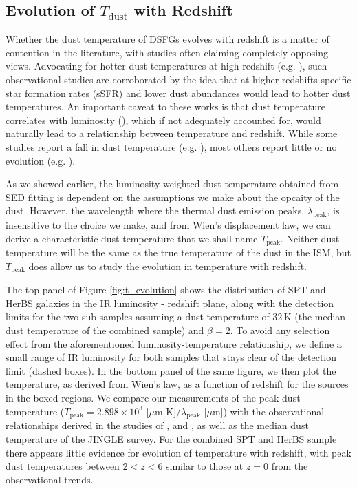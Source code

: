\subsection{Evolution of $T_{\textrm{dust}}$ with Redshift}
\label{sec:dust_temperature_evolution}

Whether the dust temperature of DSFGs evolves with redshift is a matter of contention in the literature, with studies often claiming completely opposing views. Advocating for hotter dust temperatures at high redshift (e.g. \citealt{Magdis_2012, Magnelli_2014, Swinbank_2014, Bethermin_2015, Faisst_2017, Schreiber_2018, Zavala_2018b, Liang_2019, Ma_2019, Faisst_2020, Bakx_2021, Witstok_2023}), such observational studies are corroborated by the idea that at higher redshifts specific star formation rates (sSFR) and lower dust abundances would lead to hotter dust temperatures. An important caveat to these works is that dust temperature correlates with luminosity (\citealt{Dunne_2000}), which if not adequately accounted for, would naturally lead to a relationship between temperature and redshift. While some studies report a fall in dust temperature (e.g. \citealt{Symeonidis_2013}), most others report little or no evolution (e.g. \citealt{Casey_2018, Jin_2019, Lim_2020a, Dudzeviciute_2020, Reuter_2020, Barger_2022, Drew_2022, Witstok_2023}).

As we showed earlier, the luminosity-weighted dust temperature obtained from SED fitting is dependent on the assumptions we make about the opcaity of the dust. However, the wavelength where the thermal dust emission peaks, $\lambda_\textrm{peak}$, is insensitive to the choice we make, and from Wien's displacement law, we can derive a characteristic dust temperature that we shall name $T_\textrm{peak}$. Neither dust temperature will be the same as the true temperature of the dust in the ISM, but $T_\textrm{peak}$ does allow us to study the evolution in temperature with redshift. 

The top panel of Figure \ref{fig:t_evolution} shows the distribution of SPT and HerBS galaxies in the IR luminosity - redshift plane, along with the detection limits for the two sub-samples assuming a dust temperature of $32\,$K (the median dust temperature of the combined sample) and $\beta = 2$. To avoid any selection effect from the aforementioned luminosity-temperature relationship, we define a small range of IR luminosity for both samples that stays clear of the detection limit (dashed boxes). In the bottom panel of the same figure, we then plot the temperature, as derived from Wien's law, as a function of redshift for the sources in the boxed regions. We compare our measurements of the peak dust temperature ($T_{\textrm{peak}} = 2.898 \times 10^3$ [$\mu$m K]/$\lambda_{\textrm{peak}}$ [$\mu$m]) with the observational relationships derived in the studies of \citealt{Schreiber_2018}, \citealt{Bouwens_2020} and \citealt{Viero_2022}, as well as the median dust temperature of the JINGLE survey. For the combined SPT and HerBS sample there appears little evidence for evolution of temperature with redshift, with peak dust temperatures between $2 < z < 6$ similar to those at $z = 0$ from the observational trends.

